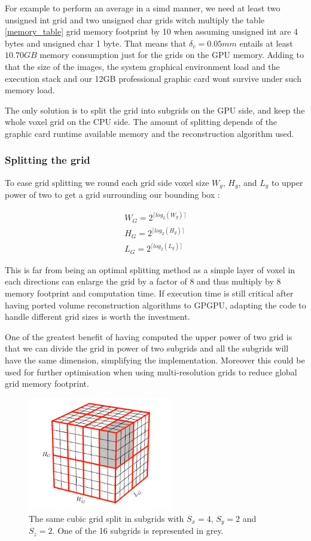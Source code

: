 \documentclass[12pt,journal,compsoc]{IEEEtran}
\begin{document}
For example to perform an average in a \acl{simd} manner, we need at least two unsigned int grid and two unsigned char grids witch multiply the table \ref{memory_table} grid memory footprint by 10 when assuming unsigned int are 4 bytes and unsigned char 1 byte.
That means that $\delta_v=0.05mm$ entails at least $10.70GB$ memory consumption just for the grids on the GPU memory.
Adding to that the size of the images, the system graphical environment load and the execution stack and our 12GB professional graphic card wont survive under such memory load.

The only solution is to split the grid into subgrids on the GPU side, and keep the whole voxel grid on the CPU side. The amount of splitting depends of the graphic card runtime available memory and the reconstruction algorithm used.

\subsubsection{Splitting the grid}
To ease grid splitting we round each grid side voxel size $W_g$, $H_g$, and $L_g$ to upper power of two to get a grid surrounding our bounding box :

\begin{eqnarray}
	W_G = 2^{\lceil log_2(W_g) \rceil}\\
	H_G = 2^{\lceil log_2(H_g) \rceil}\\
	L_G = 2^{\lceil log_2(L_g) \rceil}
\end{eqnarray}

This is far from being an optimal splitting method as a simple layer of voxel in each directions can enlarge the grid by a factor of 8 and thus multiply by 8 memory footprint and computation time. 
If execution time is still critical after having ported volume reconstruction algorithms to GPGPU, adapting the code to handle different grid sizes is worth the investment.

One of the greatest benefit of having computed the upper power of two grid is that we can divide the grid in power of two subgrids and all the subgrids will have the same dimension, simplifying the implementation. Moreover this could be used for further optimisation when using multi-resolution grids to reduce global grid memory footprint. 

\begin{figure}[!h]
\centering
\includegraphics[width=2.5in]{subgrid}
\caption{The same cubic grid split in subgrids with $S_x = 4$, $S_y=2$ and $S_z=2$. One of the 16 subgrids is represented in grey.}
\label{subgrids}
\end{figure}
\end{document}
